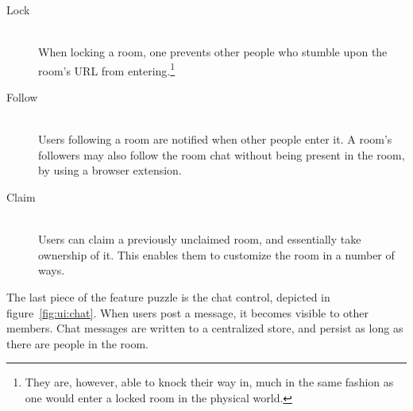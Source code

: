     \begin{description}
      \item[Lock] \hfill \\
        When locking a room, one prevents other people who stumble upon the room's URL from entering.\footnote{They are, however, able to knock their way in, much in the same fashion as one would enter a locked room in the physical world.}
      \item[Follow] \hfill \\
        Users following a room are notified when other people enter it. A room's followers may also follow the room chat without being present in the room, by using a browser extension.
      \item[Claim] \hfill \\
        Users can claim a previously unclaimed room, and essentially take ownership of it. This enables them to customize the room in a number of ways.
    \end{description}

    The last piece of the feature puzzle is the chat control, depicted in figure~\ref{fig:ui:chat}. When users post a message, it becomes visible to other members. Chat messages are written to a centralized store, and persist as long as there are people in the room.

